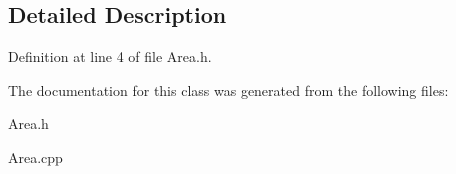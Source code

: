 \subsection{Detailed Description}


Definition at line 4 of file Area.\+h.



The documentation for this class was generated from the following files\+:\begin{DoxyCompactItemize}
\item 
Area.\+h\item 
Area.\+cpp\end{DoxyCompactItemize}

